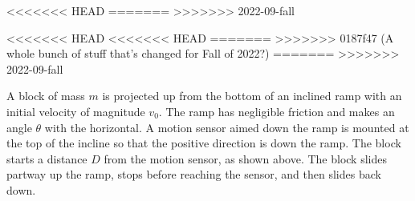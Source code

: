 \documentclass{../../oss-apphys-exam}
\begin{document}
\begin{questions}
\begin{questions}
<<<<<<< HEAD
=======
>>>>>>> 2022-09-fall

<<<<<<< HEAD
<<<<<<< HEAD
=======
>>>>>>> 0187f47 (A whole bunch of stuff that's changed for Fall of 2022?)
=======
>>>>>>> 2022-09-fall

  \question A block of mass $m$ is projected up from the bottom of an inclined
  ramp with an initial velocity of magnitude $v_0$. The ramp has negligible
  friction and makes an angle $\theta$ with the horizontal. A motion sensor
  aimed down the ramp is mounted at the top of the incline so that the positive
  direction is down the ramp. The block starts a distance $D$ from the motion
  sensor, as shown above. The block slides partway up the ramp, stops before
  reaching the sensor, and then slides back down.
\end{questions}
\end{questions}
\end{document}

